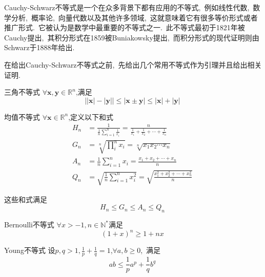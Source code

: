 Cauchy-Schwarz不等式是一个在众多背景下都有应用的不等式,\ 例如线性代数,\ 数学分析,\ 概率论,\ 向量代数以及其他许多领域,\ 这就意味着它有很多等价形式或者推广形式.\ 它被认为是数学中最重要的不等式之一.\ 此不等式最初于1821年被Cauchy提出,\ 其积分形式在1859被Buniakowsky提出,\ 而积分形式的现代证明则由Schwarz于1888年给出.\ 

在给出Cauchy-Schwarz不等式之前,\ 先给出几个常用不等式作为引理并且给出相关证明.\ 
\begin{lemma}{三角不等式}
$\forall \boldsymbol{x},\boldsymbol{y}\in\mathbb{R}^n$,满足
\begin{equation}
\lvert\lvert\boldsymbol{x}\rvert-\lvert\boldsymbol{y}\rvert\rvert\leqslant\lvert\boldsymbol{x}\pm\boldsymbol{y}\rvert\leqslant\lvert\boldsymbol{x}\rvert+\lvert\boldsymbol{y}\rvert~
\end{equation}
\end{lemma}
\begin{lemma}{均值不等式}
$\forall \boldsymbol{x}\in\mathbb{R}^n$,定义以下和式
\begin{align}
H_n&=\frac{1}{\frac{1}{n}\sum\limits_{i=1}^n\frac{1}{x_i}}=\frac{n}{\frac{1}{x_1}+\frac{1}{x_2}+\cdots+\frac{1}{x_n}}\\
G_n&=\sqrt[n]{\prod_{i}^n x_i}=\sqrt[n]{x_1x_2\cdots x_n}\\
A_n&=\frac{1}{n}\sum_{i=1}^n x_i=\frac{x_1+x_2+\cdots+x_n}{n}\\
Q_n&=\sqrt{\frac{1}{n}\sum_{i=1}^n x_i^2}=\sqrt{\frac{x_1^2+x_2^2+\cdots+x_n^2}{n}}~
\end{align}
\end{lemma}
这些和式满足
\begin{equation}
H_n\leqslant G_n\leqslant A_n \leqslant Q_n~
\end{equation}
\begin{lemma}{Bernoulli不等式}
$\forall x > -1,n \in \mathbb{N}^{\ast}$满足
\begin{equation}
(1+x)^n \geq 1+nx~
\end{equation}
\end{lemma}
\begin{lemma}{Young不等式}
设$p,q>1,\frac{1}{p}+\frac{1}{q}=1$,$\forall a,b\geqslant 0$,\ 满足 
\begin{equation}
a b \leqslant \frac{1}{p}a^{p}+\frac{1}{q}b^{q}~
\end{equation}
\end{lemma}
